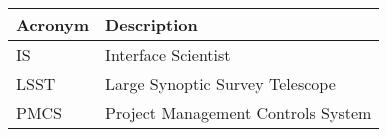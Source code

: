 \addtocounter{table}{-1}
\begin{longtable}{p{}p{}}\hline
\textbf{Acronym} & \textbf{Description}  \\\hline

IS & Interface Scientist \\\hline
LSST & Large Synoptic Survey Telescope \\\hline
PMCS & Project Management Controls System \\\hline
\end{longtable}

